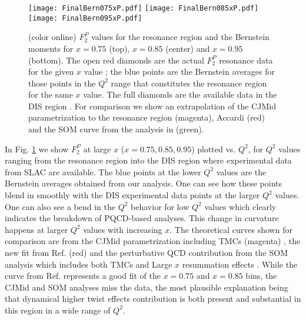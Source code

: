 \documentclass[
twocolumn,
aps,prd,
nofootinbib,
superscriptaddress,
showpacs,ligh
tightenlines, 
]{revtex4}
\begin{document}
\begin{figure}[htp]
\texttt{[image: FinalBern075xP.pdf]}
\texttt{[image: FinalBern085xP.pdf]}
\texttt{[image: FinalBern095xP.pdf]}
\caption{(color online) $F_{2}^{P}$ values for the resonance region and the Bernstein moments  for $x = 0.75$ (top), $x = 0.85$ (center) and $x = 0.95$ (bottom).   The open red diamonds are the actual $F_2^P$ resonance data for the given $x$ value \cite{J.S.Poucher:1974,Malace:2009kw}; the blue points are the Bernstein averages for those points in the $Q^{2}$ range that constitutes the resonance region for the same $x$ value. The full diamonds are the available data in the DIS region \cite{J.S.Poucher:1974}. For comparison we show an extrapolation of the CJMid parametrization to the resonance region \cite{Accardi:2009br} \cite{Buckley:2014ana} (magenta), Accardi (red) \cite{Accardi:2016qay} and the SOM curve from the analysis in \cite{Askanazi:2014gxa} (green). 
}
\label{fig:FinalBern075xP}
\end{figure}
In Fig. \ref{fig:FinalBern075xP} we show  $F_{2}^{P}$ at large $x$ ($x = 0.75,0.85, 0.95$) plotted vs. $Q^2$, for $Q^2$ values ranging from the resonance region into the DIS region where experimental data from SLAC are available. The blue points at the lower $Q^2$ values are the Bernstein averages obtained from our analysis. One can see how these points blend in smoothly with the DIS experimental data points at the larger $Q^2$ values. One can also see a bend in the $Q^2$ behavior for low $Q^2$ values which clearly indicates the breakdown of PQCD-based analyses. This change in curvature happens at larger $Q^2$ values with increasing $x$.
The theoretical curves shown for comparison are from the CJMid parametrization including TMCs (magenta) \cite{Accardi:2009br}, the new fit from  Ref.\cite{Accardi:2016qay} (red) and the perturbative QCD contribution from the SOM analysis which includes both TMCs and Large $x$ resummation effects \cite{Askanazi:2014gxa}. While the curve from Ref.\cite{Accardi:2016qay} represents a good fit of the  $x=0.75$ and $x=0.85$ bins, the CJMid and SOM analyses miss the data, the most plausible explanation being that dynamical higher twist effects contribution is both present and substantial in this region in a wide range of $Q^2$.

\end{document}

